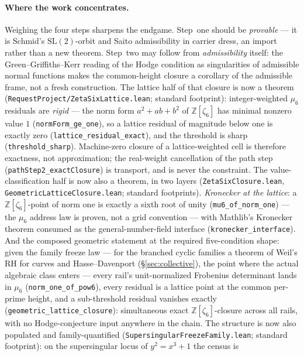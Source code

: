 \documentclass[11pt]{article}
\theoremstyle{definition}
\theoremstyle{remark}
\begin{document}
\paragraph{Where the work concentrates.} Weighing the four steps sharpens the
endgame. Step~one should be \emph{provable} --- it is Schmid's
$\mathrm{SL}(2)$-orbit and Saito admissibility in carrier dress, an import rather
than a new theorem. Step~two may follow from \emph{admissibility} itself: the
Green--Griffiths--Kerr reading of the Hodge condition as singularities of
admissible normal functions makes the common-height closure a corollary of the
admissible frame, not a fresh construction. The lattice half of that closure is
now a theorem (\texttt{RequestProject/ZetaSixLattice.lean}; standard
footprint): integer-weighted $\mu_6$ residuals are \emph{rigid} --- the norm
form $a^2+ab+b^2$ of $\mathbb Z[\zeta_6]$ has minimal nonzero value $1$
(\texttt{normForm\_ge\_one}), so a lattice residual of magnitude below one is
exactly zero (\texttt{lattice\_residual\_exact}), and the threshold is sharp
(\texttt{threshold\_sharp}). Machine-zero closure of a lattice-weighted cell is
therefore exactness, not approximation; the real-weight cancellation of the
path step (\texttt{pathStep2\_exactClosure}) is transport, and is never the
constraint.  The value-classification half is now also a theorem, in two
layers (\texttt{ZetaSixClosure.lean}, \texttt{GeometricLatticeClosure.lean};
standard footprints).  \emph{Kronecker at the lattice}: a
$\mathbb Z[\zeta_6]$-point of norm one is exactly a sixth root of unity
(\texttt{mu6\_of\_norm\_one}) --- the $\mu_6$ address law is proven, not a
grid convention --- with Mathlib's Kronecker theorem consumed as the
general-number-field interface (\texttt{kronecker\_interface}).  And the
composed geometric statement at the required five-condition shape: given
the family freeze law --- for the branched cyclic families a theorem of
Weil's RH for curves and Hasse--Davenport (\S\ref{sec:collective}), the
point where the actual algebraic class enters --- every rail's
unit-normalized Frobenius determinant lands in $\mu_6$
(\texttt{norm\_one\_of\_pow6}), every residual is a lattice point at the
common per-prime height, and a sub-threshold residual vanishes exactly
(\texttt{geometric\_lattice\_closure}): simultaneous exact
$\mathbb Z[\zeta_6]$-closure across all rails, with no Hodge-conjecture
input anywhere in the chain.  The structure is now also populated and
family-quantified (\texttt{SupersingularFreezeFamily.lean}; standard
footprint): on the supersingular locus of $y^2=x^3+1$ the census is
\end{document}
